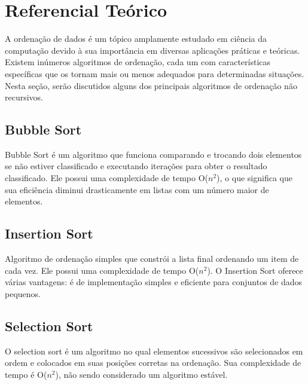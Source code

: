\section{Referencial Teórico}

A ordenação de dados é um tópico amplamente estudado em ciência da computação devido à sua importância em diversas aplicações práticas e teóricas. Existem inúmeros algoritmos de ordenação, cada um com características específicas que os tornam mais ou menos adequados para determinadas situações. Nesta seção, serão discutidos alguns dos principais algoritmos de ordenação não recursivos.

\subsection{Bubble Sort}
Bubble Sort é um algoritmo que funciona comparando e trocando dois elementos se não estiver classificado e executando iterações para obter o resultado classificado\cite{analiseBubbleSort:2021}. Ele possui uma complexidade de tempo O($n^2$), o que significa que sua eficiência diminui drasticamente em listas com um número maior de elementos\cite{al2013review}.

\subsection{Insertion Sort}
Algoritmo de ordenação simples que constrói a lista final ordenando um item de cada vez. Ele possui uma complexidade de tempo O($n^2$). O Insertion Sort oferece várias vantagens: é de implementação simples e eficiente para conjuntos de dados pequenos\cite{al2013review}.

\subsection{Selection Sort}
O selection sort é um algoritmo no qual elementos sucessivos são selecionados em ordem e colocados em suas posições corretas na ordenação\cite{chand2011upgraded}. Sua complexidade de tempo é O($n^2$), não sendo considerado um algoritmo estável\cite{treinawebConheaPrincipais}.